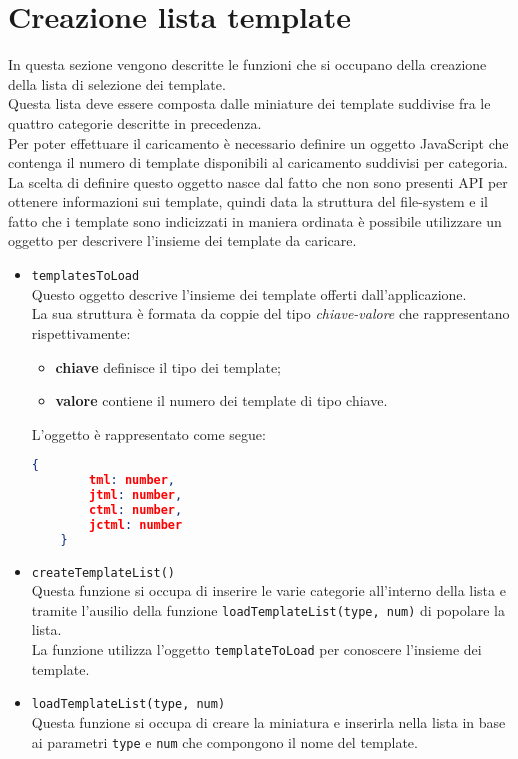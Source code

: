 \section{Creazione lista template}
In questa sezione vengono descritte le funzioni che si occupano della creazione della lista di selezione dei template.\\
Questa lista deve essere composta dalle miniature dei template suddivise fra le quattro categorie descritte in precedenza.\\
Per poter effettuare il caricamento è necessario definire un oggetto JavaScript che contenga il numero di template disponibili al caricamento suddivisi per categoria.\\
La scelta di definire questo oggetto nasce dal fatto che non sono presenti API per ottenere informazioni sui template, quindi data la struttura del file-system e il fatto che i template sono indicizzati in maniera ordinata è possibile utilizzare un oggetto per descrivere l'insieme dei template da caricare.\\

\begin{itemize}
	\item \texttt{templatesToLoad}\\
	Questo oggetto descrive l'insieme dei template offerti dall'applicazione.\\
	La sua struttura è formata da coppie del tipo \textit{chiave-valore} che rappresentano rispettivamente:
	\begin{itemize}
		\item \textbf{chiave} definisce il tipo dei template;
		\item \textbf{valore} contiene il numero dei template di tipo chiave.
	\end{itemize}
	L'oggetto è rappresentato come segue:
	\begin{lstlisting}[language=JSON, caption= Struttura oggetto \texttt{templatesToLoad}.]
	{
		tml: number,
		jtml: number,
		ctml: number,
		jctml: number
	}
	\end{lstlisting}
	
	\item \texttt{createTemplateList()}\\
	Questa funzione si occupa di inserire le varie categorie all'interno della lista e tramite l'ausilio della funzione \texttt{loadTemplateList(type, num)} di popolare la lista.\\
	La funzione utilizza l'oggetto \texttt{templateToLoad} per conoscere l'insieme dei template.
	
	\item \texttt{loadTemplateList(type, num)}\\
	Questa funzione si occupa di creare la miniatura e inserirla nella lista in base ai parametri \texttt{type} e \texttt{num} che compongono il nome del template.
\end{itemize}

